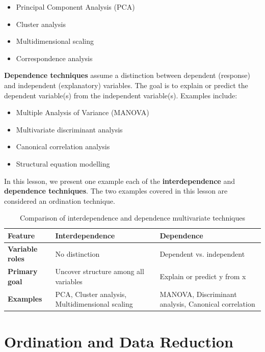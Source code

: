 \documentclass[
]{book}
\providecommand{\tightlist}{%
  \setlength{\itemsep}{0pt}\setlength{\parskip}{0pt}}
\begin{document}
\begin{itemize}
\tightlist
\item
  Principal Component Analysis (PCA)
\item
  Cluster analysis
\item
  Multidimensional scaling
\item
  Correspondence analysis
\end{itemize}

\textbf{Dependence techniques} assume a distinction between dependent (response) and independent (explanatory) variables. The goal is to explain or predict the dependent variable(s) from the independent variable(s). Examples include:

\begin{itemize}
\tightlist
\item
  Multiple Analysis of Variance (MANOVA)
\item
  Multivariate discriminant analysis
\item
  Canonical correlation analysis
\item
  Structural equation modelling
\end{itemize}

In this lesson, we present one example each of the \textbf{interdependence} and \textbf{dependence techniques}. The two examples covered in this lesson are considered an ordination technique.

\begin{table}
\centering
\caption{\label{tab:mv-categories}Comparison of interdependence and dependence multivariate techniques}
\centering
\begin{tabu} to 
\hline
Feature & Interdependence & Dependence\\
\hline
\textbf{Variable roles} & No distinction & Dependent vs. independent\\
\hline
\textbf{Primary goal} & Uncover structure among all variables & Explain or predict y from x\\
\hline
\textbf{Examples} & PCA, Cluster analysis, Multidimensional scaling & MANOVA, Discriminant analysis, Canonical correlation\\
\hline
\end{tabu}
\end{table}

\section{Ordination and Data Reduction}\label{ordination-and-data-reduction}
\end{document}
